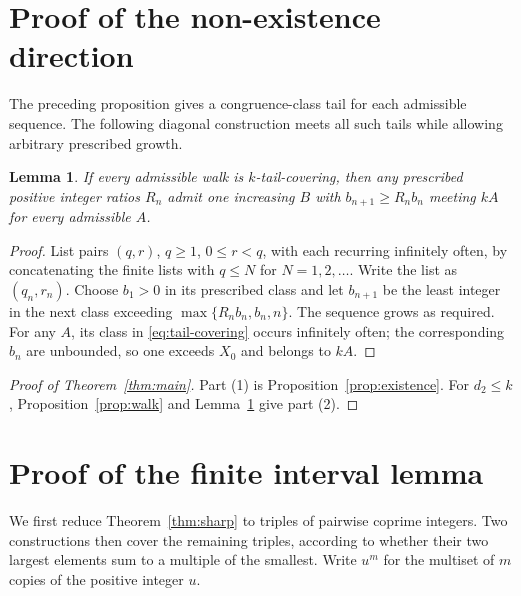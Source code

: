 \documentclass[11pt,a4paper,reqno]{amsart}
\newtheorem{lemma}[theorem]{Lemma}
\theoremstyle{definition}
\theoremstyle{remark}
\begin{document}
\section{Proof of the non-existence direction}
The preceding proposition gives a congruence-class tail for each admissible
sequence. The following diagonal construction meets all such tails while
allowing arbitrary prescribed growth.
\begin{lemma}\label{lem:certificate}
If every admissible walk is $k$-tail-covering, then any prescribed positive
integer ratios $R_n$ admit one increasing $B$ with $b_{n+1}\ge R_nb_n$
meeting $kA$ for every admissible $A$.
\end{lemma}
\begin{proof}
List pairs $(q,r)$, $q\ge1$, $0\le r<q$, with each recurring infinitely
often, by concatenating the finite lists with $q\le N$ for $N=1,2,\ldots$.
Write the list as $(q_n,r_n)$. Choose $b_1>0$ in its prescribed class and
let $b_{n+1}$ be the least integer in the next class exceeding
$\max\{R_nb_n,b_n,n\}$. The sequence grows as required. For any $A$,
its class in \eqref{eq:tail-covering} occurs infinitely often; the
corresponding $b_n$ are unbounded, so one exceeds $X_0$ and belongs to $kA$.
\end{proof}
\begin{proof}[Proof of Theorem~\ref{thm:main}]
Part (1) is Proposition~\ref{prop:existence}. For $d_2\le k$,
Proposition~\ref{prop:walk} and Lemma~\ref{lem:certificate} give part (2).
\end{proof}

\section{Proof of the finite interval lemma}\label{sec:sharp-proof}
We first reduce Theorem~\ref{thm:sharp} to triples of pairwise coprime
integers. Two constructions then cover the remaining triples, according to
whether their two largest elements sum to a multiple of the smallest.
Write $u^m$ for the multiset of $m$ copies of the positive integer $u$.
\end{document}
